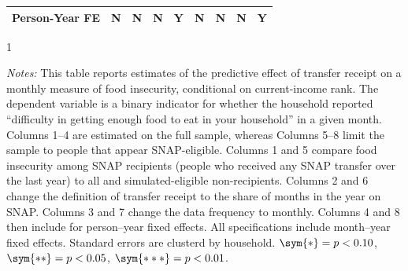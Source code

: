 \begin{table}[]
\begin{tabular*}{1.36\textwidth}{@{\extracolsep{\fill}}lcccccccc}
Person-Year FE         & N                    & N                    & N                    & Y                    & N                    & N                    & N                    & Y                      \\ \bottomrule
        \end{tabular*}
        \begin{spacing}{1}
            \begin{tablenotes}
                  \item \footnotesize \textit{Notes:} This table reports estimates of the predictive effect of transfer receipt on a monthly measure of food insecurity, conditional on current-income rank. The dependent variable is a binary indicator for whether the household reported ``difficulty in getting enough food to eat in your household'' in a given month. Columns 1--4 are estimated on the full sample, whereas Columns 5--8 limit the sample to people that appear SNAP-eligible. Columns 1 and 5 compare food insecurity among SNAP recipients (people who received any SNAP transfer over the last year) to all and simulated-eligible non-recipients. Columns 2 and 6 change the definition of transfer receipt to the share of months in the year on SNAP. Columns 3 and 7 change the data frequency to monthly. Columns 4 and 8 then include for person--year fixed effects. All specifications include month--year fixed effects. Standard errors are clusterd by household. $\sym{*} = p < 0.10$, $\sym{**} = p < 0.05$, $\sym{***} = p < 0.01$.   \end{tablenotes}
           \end{spacing}
\end{table}
